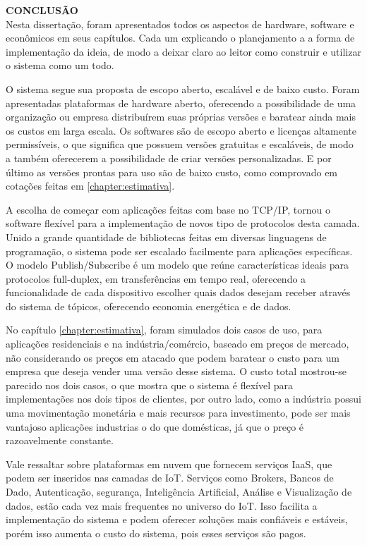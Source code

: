 \noindent\textbf{CONCLUSÃO}
$\!$\\


Nesta dissertação, foram apresentados todos os aspectos de hardware, software e econômicos em seus capítulos. Cada um explicando o planejamento a a forma de implementação da ideia, de modo a deixar claro ao leitor como construir e utilizar o sistema como um todo.

O sistema segue sua proposta de escopo aberto, escalável e de baixo custo. Foram apresentadas plataformas de hardware aberto, oferecendo a possibilidade de uma organização ou empresa distribuírem suas próprias versões e baratear ainda mais os custos em larga escala. Os softwares são de escopo aberto e licenças altamente permissíveis, o que significa que possuem versões gratuitas e escaláveis, de modo a também oferecerem a possibilidade de criar versões personalizadas. E por último as versões prontas para uso são de baixo custo, como comprovado em cotações feitas em \ref{chapter:estimativa}.

A escolha de começar com aplicações feitas com base no TCP/IP, tornou o software flexível para a implementação de novos tipo de protocolos desta camada. Unido a grande quantidade de bibliotecas feitas em diversas linguagens de programação, o sistema pode ser escalado facilmente para aplicações específicas. O modelo Publish/Subscribe é um modelo que reúne características ideais para protocolos full-duplex, em transferências em tempo real, oferecendo a funcionalidade de cada dispositivo escolher quais dados desejam receber através do sistema de tópicos, oferecendo economia energética e de dados.

No capítulo \ref{chapter:estimativa}, foram simulados dois casos de uso, para aplicações residenciais e na indústria/comércio, baseado em preços de mercado, não considerando os preços em atacado que podem baratear o custo para um empresa que deseja vender uma versão desse sistema. O custo total mostrou-se parecido nos dois casos, o que mostra que o sistema é flexível para implementações nos dois tipos de clientes, por outro lado, como a indústria possui uma movimentação monetária e mais recursos para investimento, pode ser mais vantajoso aplicações industrias o do que domésticas, já que o preço é razoavelmente constante.

Vale ressaltar sobre plataformas em nuvem que fornecem serviços IaaS, que podem ser inseridos nas camadas de IoT. Serviços como Brokers, Bancos de Dado, Autenticação, segurança, Inteligência Artificial, Análise e Visualização de dados, estão cada vez mais frequentes no universo do IoT. Isso facilita a implementação do sistema e podem oferecer soluções mais confiáveis e estáveis, porém isso aumenta o custo do sistema, pois esses serviços são pagos.

